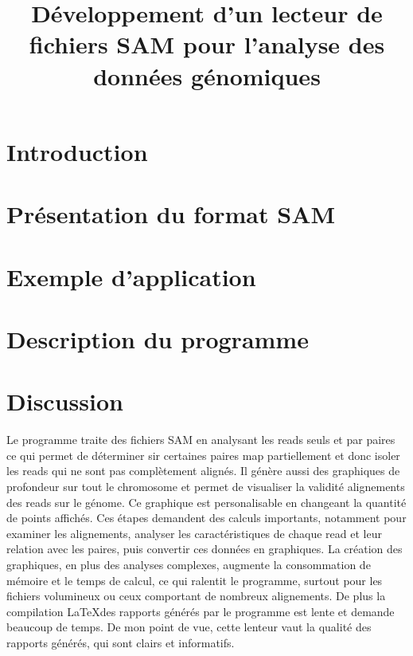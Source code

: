 \documentclass[11pt]{article}
\begin{document}
\title{Développement d'un lecteur de fichiers SAM pour l'analyse des données génomiques}
\maketitle

\section{Introduction}\label{sec:introduction}


\section{Présentation du format SAM}\label{sec:presentation-du-format-sam}


\section{Exemple d'application}\label{sec:exemple-d'application}


\section{Description du programme}\label{sec:description-du-programme}


\section{Discussion}\label{sec:discussion}
Le programme traite des fichiers SAM en analysant les reads seuls et par paires ce qui permet de déterminer sir certaines paires map partiellement et donc isoler les reads qui ne sont pas complètement alignés.
Il génère aussi des graphiques de profondeur sur tout le chromosome et permet de visualiser la validité alignements des reads sur le génome.
Ce graphique est personalisable en changeant la quantité de points affichés.
Ces étapes demandent des calculs importants, notamment pour examiner les alignements, analyser les caractéristiques de chaque read et leur relation avec les paires, puis convertir ces données en graphiques.
La création des graphiques, en plus des analyses complexes, augmente la consommation de mémoire et le temps de calcul, ce qui ralentit le programme, surtout pour les fichiers volumineux ou ceux comportant de nombreux alignements.
De plus la compilation \LaTeX des rapports générés par le programme est lente et demande beaucoup de temps.
De mon point de vue, cette lenteur vaut la qualité des rapports générés, qui sont clairs et informatifs.
\end{document}
